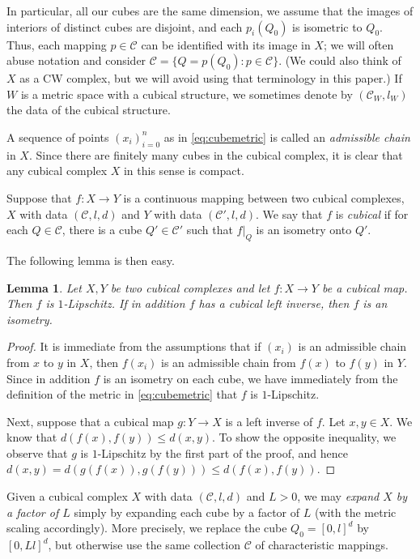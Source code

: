 \documentclass{amsart}
\theoremstyle{plain}
\newtheorem{lemma}[theorem]{Lemma}
\theoremstyle{definition}
\numberwithin{equation}{section}
\numberwithin{theorem}{section}
\newcommand{\cC}{\mathcal{C}}
\begin{document}
In particular, all our cubes are the same dimension, we assume that the images of interiors of distinct cubes are disjoint, and each $p_i(Q_0)$ is isometric to $Q_0$. Thus, each mapping $p\in\cC$ can be identified with its image in $X$; we will often abuse notation and consider $\cC = \{Q=p(Q_0):p\in\cC\}$. (We could also think of $X$ as a CW complex, but we will avoid using that terminology in this paper.) If $W$ is a metric space with a cubical structure, we sometimes denote by $(\cC_W, l_W)$ the data of the cubical structure.

A sequence of points $(x_i)_{i=0}^n$ as in \eqref{eq:cubemetric} is called an \emph{admissible chain} in $X$. Since there are finitely many cubes in the cubical complex, it is clear that any cubical complex $X$ in this sense is compact.

Suppose that $f:X\to Y$ is a continuous mapping between two cubical complexes, $X$ with data $(\cC,l,d)$ and $Y$ with data $(\cC',l,d)$. We say that $f$ is \emph{cubical} if for each $Q\in\cC$, there is a cube $Q'\in\cC'$ such that $f|_Q$ is an isometry onto $Q'$.  

The following lemma is then easy.
\begin{lemma} \label{lem:cubicallemma} Let $X,Y$ be two cubical complexes and let $f\colon X \rightarrow Y$ be a cubical map. Then $f$ is $1$-Lipschitz. If in addition $f$ has a cubical left inverse, then $f$ is an isometry.
\end{lemma}
\begin{proof}
It is immediate from the assumptions that if $(x_i)$ is an admissible chain from $x$ to $y$ in $X$, then $f(x_i)$ is an admissible chain from $f(x)$ to $f(y)$ in $Y$. Since in addition $f$ is an isometry on each cube, we have immediately from the definition of the metric in \eqref{eq:cubemetric} that $f$ is $1$-Lipschitz. 

Next, suppose that a cubical map $g:Y\to X$ is a left inverse of $f$. Let $x,y\in X$. We know that $d(f(x),f(y))\leq d(x,y)$. To show the opposite inequality, we observe that $g$ is $1$-Lipschitz by the first part of the proof, and hence $d(x,y)=d(g(f(x)), g(f(y)))\leq d(f(x),f(y))$.
\end{proof}


Given a cubical complex $X$ with data $(\cC,l,d)$ and $L>0$, we may \emph{expand $X$ by a factor of $L$} simply by expanding each cube by a factor of $L$  (with the metric scaling accordingly). More precisely, we replace the cube $Q_0=[0,l]^d$ by $[0,Ll]^d$, but otherwise use the same collection $\cC$ of characteristic mappings.
\end{document}
